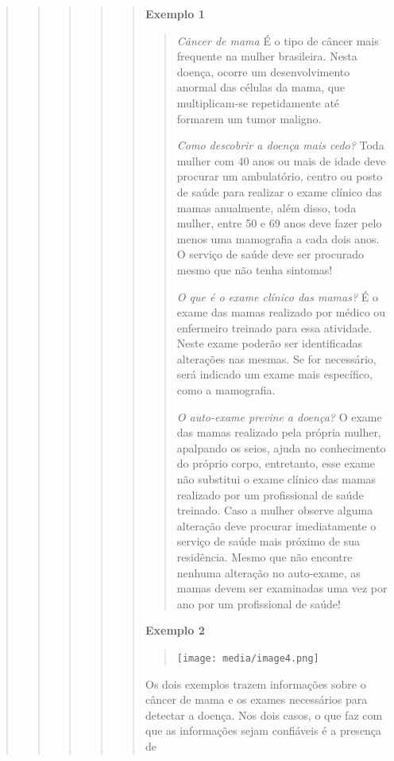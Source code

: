 \begin{quote}
\begin{quote}
\begin{quote}
\begin{quote}
\begin{quote}
\textbf{Exemplo 1}

\begin{quote}

\textit{Câncer de mama}
É o tipo de câncer mais frequente na mulher brasileira. Nesta doença,
ocorre um desenvolvimento anormal das células da mama, que
multiplicam-se repetidamente até formarem um tumor maligno.

\textit{Como descobrir a doença mais cedo?}
Toda mulher com 40 anos ou mais de idade deve procurar um ambulatório,
centro ou posto de saúde para realizar o exame clínico das mamas
anualmente, além disso, toda mulher, entre 50 e 69 anos deve fazer pelo
menos uma mamografia a cada dois anos. O serviço de saúde deve ser
procurado mesmo que não tenha sintomas!

\textit{O que é o exame clínico das mamas?}
É o exame das mamas realizado por médico ou enfermeiro treinado para
essa atividade. Neste exame poderão ser identificadas alterações nas
mesmas. Se for necessário, será indicado um exame mais específico, como
a mamografia.

\textit{O auto-exame previne a doença?}
O exame das mamas realizado pela própria mulher, apalpando os seios,
ajuda no conhecimento do próprio corpo, entretanto, esse exame não
substitui o exame clínico das mamas realizado por um profissional de
saúde treinado. Caso a mulher observe alguma alteração deve procurar
imediatamente o serviço de saúde mais próximo de sua residência. Mesmo
que não encontre nenhuma alteração no auto-exame, as mamas devem ser
examinadas uma vez por ano por um profissional de saúde!

\end{quote}


\textbf{Exemplo 2}

\begin{quote}

\texttt{[image: media/image4.png]}

\end{quote}


Os dois exemplos trazem informações sobre o câncer de mama e os exames
necessários para detectar a doença. Nos dois casos, o que faz com que as
informações sejam confiáveis é a presença de


\end{quote}
\end{quote}
\end{quote}
\end{quote}
\end{quote}

